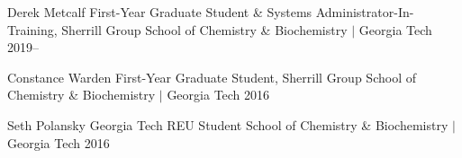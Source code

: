 

\begin{cvservices}
  \cvservice
    {Derek Metcalf} %
    {First-Year Graduate Student \& Systems Administrator-In-Training, Sherrill Group} %
    {School of Chemistry \& Biochemistry $\vert$ Georgia Tech} %
    {2019--} %

%
%
%
  \cvservice
    {Constance Warden} %
    {First-Year Graduate Student, Sherrill Group} %
    {School of Chemistry \& Biochemistry $\vert$ Georgia Tech} %
    {2016} %

  \cvservice
    {Seth Polansky} %
    {Georgia Tech REU Student} %
    {School of Chemistry \& Biochemistry $\vert$ Georgia Tech} %
    {2016} %

\end{cvservices}




